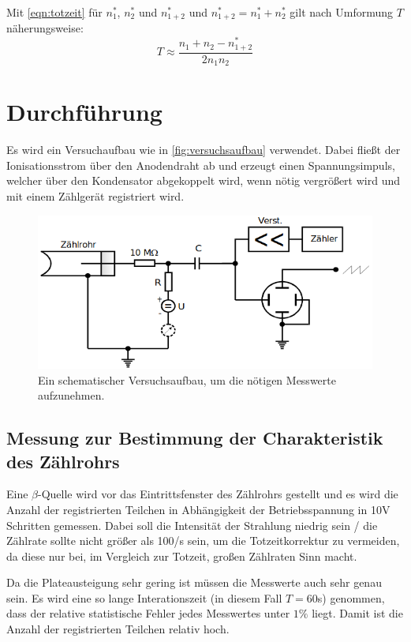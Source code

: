 \documentclass[titlepage = firstcover]{scrartcl}
\begin{document}
          Mit \autoref{eqn:totzeit} für $n^*_1$, $n^*_2$ und $n^*_{1+2}$ und $n^*_{1+2} = n^*_1 + n^*_2$ gilt nach Umformung $T$ näherungsweise:
          \begin{equation}
            T \approx \frac{n_1  + n_2 - n^*_{1+2}}{2 n_1 n_2}
            \label{eqn:zwei_quellen_methode_totzeit}
          \end{equation}
          
    
    \section{Durchführung}
      Es wird ein Versuchaufbau wie in \autoref{fig:versuchsaufbau} verwendet. Dabei fließt der Ionisationsstrom über den Anodendraht ab und erzeugt einen Spannungsimpuls, welcher über den Kondensator abgekoppelt wird, wenn nötig vergrößert wird und mit einem Zählgerät registriert wird.
      \begin{figure}[h]
        \centering
        \includegraphics[width = 0.7\linewidth]{Versuchsaufbau.png}
        \caption{Ein schematischer Versuchsaufbau, um die nötigen Messwerte aufzunehmen.}
        \label{fig:versuchsaufbau}
      \end{figure}
      \FloatBarrier

        \subsection{Messung zur Bestimmung der Charakteristik des Zählrohrs}
        Eine $\beta$-Quelle wird vor das Eintrittsfenster des Zählrohrs gestellt und es wird die Anzahl der registrierten Teilchen in Abhängigkeit der Betriebsspannung in 10V Schritten gemessen. Dabei soll die Intensität der Strahlung niedrig sein / die Zählrate sollte nicht größer als 100/s sein, um die Totzeitkorrektur zu vermeiden, da diese nur bei, im Vergleich zur Totzeit, großen Zählraten Sinn macht.

        Da die Plateausteigung sehr gering ist müssen die Messwerte auch sehr genau sein. Es wird eine so lange Interationszeit (in diesem Fall $T = 60$s) genommen, dass der relative statistische Fehler jedes Messwertes unter $1 \%$ liegt. Damit ist die Anzahl der registrierten Teilchen relativ hoch.
\end{document}
